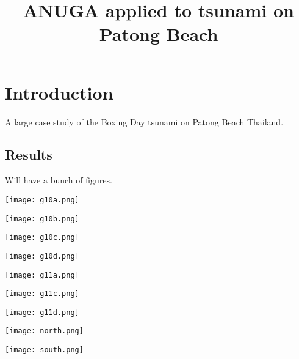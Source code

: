 \documentclass{article}
\begin{document}
\title{ANUGA applied to tsunami on Patong Beach}

\maketitle

\section{Introduction}

A large case study of the Boxing Day tsunami on Patong Beach Thailand. 

\subsection{Results}


Will have a bunch of figures.


\begin{center}
\texttt{[image: g10a.png]}
\end{center}


\begin{center}
\texttt{[image: g10b.png]}
\end{center}

\begin{center}
\texttt{[image: g10c.png]}
\end{center}

\begin{center}
\texttt{[image: g10d.png]}
\end{center}

\begin{center}
\texttt{[image: g11a.png]}
\end{center}

\begin{center}
\texttt{[image: g11c.png]}
\end{center}

\begin{center}
\texttt{[image: g11d.png]}
\end{center}

\begin{center}
\texttt{[image: north.png]}
\end{center}

\begin{center}
\texttt{[image: south.png]}
\end{center}
\end{document}

